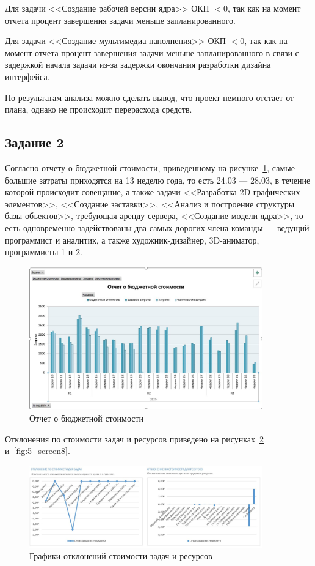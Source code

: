 Для задачи <<Создание рабочей версии ядра>> ОКП $< 0$, так как на момент отчета процент завершения задачи меньше запланированного.

Для задачи <<Создание мультимедиа-наполнения>> ОКП $< 0$, так как на момент отчета процент завершения задачи меньше запланированного в связи с задержкой начала задачи из-за задержки окончания разработки дизайна интерфейса.

По результатам анализа можно сделать вывод, что проект немного отстает от плана, однако не происходит перерасхода средств.

\subsection{Задание 2}

Согласно отчету о бюджетной стоимости, приведенному на рисунке~\ref{fig:5_screen6}, самые большие затраты приходятся на 13 неделю года, то есть 24.03 --- 28.03, в течение которой происходит совещание, а также задачи <<Разработка 2D графических элементов>>, <<Создание заставки>>, <<Анализ и построение структуры базы объектов>>, требующая аренду сервера, <<Создание модели ядра>>, то есть одновременно задействованы два самых дорогих члена команды --- ведущий программист и аналитик, а также художник-дизайнер, 3D-аниматор, программисты 1 и 2.

\begin{figure}[H]
	\centering
	\includegraphics[width=0.9\textwidth]{img/lab5/screen3.jpg}
	\caption{Отчет о бюджетной стоимости}
	\label{fig:5_screen6}
\end{figure}

Отклонения по стоимости задач и ресурсов приведено на рисунках~\ref{fig:5_screen7} и~\ref{fig:5_screen8}.

\begin{figure}[H]
	\centering
	\includegraphics[width=0.9\textwidth]{img/lab5/screen4_2.jpg}
	\caption{Графики отклонений стоимости задач и ресурсов}
	\label{fig:5_screen7}
\end{figure}


